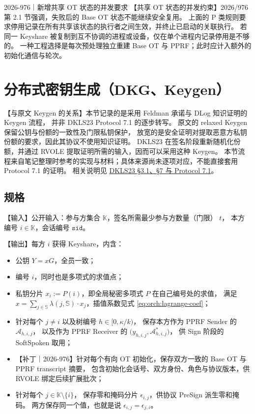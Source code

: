 \begin{patchnote}{2026-976｜新增共享 OT 状态的并发要求}
【共享 OT 状态的并发约束】2026/976 第 2.1 节强调，失败后的 Base OT 状态不能继续安全复用。
上面的 P 类规则要求停用记录在所有共享该状态的执行者之间生效，并终止已启动的关联执行。
若同一 Keyshare 被复制到互不协调的进程或设备，仅在单个进程内记录停用是不够的。
一种工程选择是每次预处理独立重建 Base OT 与 PPRF；此时应计入额外的初始化通信与轮次。
\end{patchnote}

\section{分布式密钥生成（DKG、Keygen）}

【与原文 Keygen 的关系】本节记录的是采用 Feldman 承诺与 DLog 知识证明的 Keygen 流程，
并非 DKLS23 Protocol 7.1 的逐步转写。
原文的 relaxed Keygen 保留公钥与份额的一致性及门限私钥保护，
放宽的是安全证明对提取恶意方私钥份额的要求，因此其协议不使用知识证明。
DKLS23 在签名阶段重新随机化份额，并通过 RVOLE 提取证明所需的输入，因而可以采用这种 Keygen。
本节流程来自笔记整理时参考的实现与材料；具体来源尚未逐项对应，不能直接套用 Protocol 7.1 的证明。
相关说明见 \href{https://eprint.iacr.org/2023/765.pdf}{DKLS23 \S3.1、\S7 与 Protocol 7.1}。

\subsection{规格}

【输入】公开输入：参与方集合 $\mathbb{K}$，签名所需最少参与方数量（门限） $t$，
本方编号 $i\in\mathbb{K}$，会话编号 $\mathtt{sid}$。

【输出】每方 $i$ 获得 Keyshare，内含：

\begin{itemize}
\item
  公钥 $Y=xG$，全员一致；
\item
  编号 $i$，同时也是多项式的求值点；
\item
  私钥分片 $x_i := P(i)$，即全局秘密多项式 $P$ 在自己编号处的求值，
  满足 $x=\sum_{j\in\mathbb{S}}\lambda(j,\mathbb{S})\cdot x_j$，插值系数见式 \eqref{eq:orch:lagrange-coef}；
\item
  针对每个 $j\ne i$ 以及树编号 $h\in[0,\kappa/k)$，
  保存本方作为 PPRF Sender 的 $\mathcal{A}_{h,i,j}$，
  以及作为 PPRF Receiver 的 $\bigl(y_{h,i,j}, \mathcal{A}^*_{h,i,j}\bigr)$，
  供 Sign 阶段的 SoftSpoken 取用；
\item
  【补丁｜2026-976】针对每个有向 OT 初始化，保存双方一致的 Base OT 与 PPRF transcript 摘要，
  包含初始化会话号、双方身份、角色与协议版本，供 RVOLE 绑定后续扩展批次；
\item
  针对每个 $j\in\mathbb{K}\setminus\{i\}$，
  保存零和掩码分片 $\epsilon_{i,j}$，供协议 PreSign 派生零和掩码。
  两方保存同一个值，也就是说 $\epsilon_{i,j}=\epsilon_{j,i}$。
\end{itemize}

